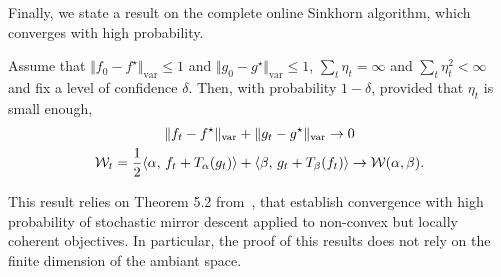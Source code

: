 Finally, we state a result on the complete online Sinkhorn algorithm, which converges with high probability.
\begin{proposition}
    Assume that $\Vert f_0 - f^\star \Vert_{\text{var}} \leq 1$ and $\Vert g_0 -
    g^\star \Vert_{\text{var}} \leq 1$, $\sum_t \eta_t = \infty$ and $\sum_t
    \eta_t^2 < \infty$ and fix a level of confidence $\delta$. Then, with
    probability $1- \delta$, provided that $\eta_t$ is small enough,
    \begin{gather}
        \Vert f_t - f^\star \Vert_{\text{var}} + \Vert g_t - 
        g^\star \Vert_{\text{var}} \to 0 \\
        \mathcal{W}_t =\frac{1}{2} \langle \alpha,\,f_t + T_{\alpha}(g_t)\rangle + \langle \beta,\,g_t + T_{\beta}(f_t)\rangle 
        \to \mathcal{W}(\alpha, \beta).
    \end{gather}
\end{proposition}
This result relies on Theorem 5.2 from~\citet{zhou2017convergence}, that establish convergence with
high probability of stochastic mirror descent applied to non-convex but locally coherent objectives. In particular, the proof of this results does not rely on the finite dimension of the ambiant space.

